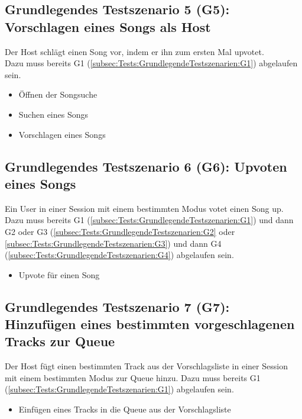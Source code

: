 \documentclass[oneside, ngerman]{sdqtechreport}
\begin{document}
\subsection{Grundlegendes Testszenario 5 (G5): Vorschlagen eines Songs als Host}
\label{subsec:Tests:GrundlegendeTestszenarien:G5}
Der Host schlägt einen Song vor, indem er ihn zum ersten Mal upvotet. \\
Dazu muss bereits G1 (\ref{subsec:Tests:GrundlegendeTestszenarien:G1}) abgelaufen sein.
\begin{itemize}
    \item Öffnen der Songsuche
    \item Suchen eines Songs
    \item Vorschlagen eines Songs
\end{itemize}

\subsection{Grundlegendes Testszenario 6 (G6): Upvoten eines Songs}
\label{subsec:Tests:GrundlegendeTestszenarien:G6}
Ein User in einer Session mit einem bestimmten Modus votet einen Song up. \\
Dazu muss bereits G1 (\ref{subsec:Tests:GrundlegendeTestszenarien:G1}) und dann G2 oder G3 (\ref{subsec:Tests:GrundlegendeTestszenarien:G2} oder \ref{subsec:Tests:GrundlegendeTestszenarien:G3}) und dann G4 (\ref{subsec:Tests:GrundlegendeTestszenarien:G4}) abgelaufen sein.
\begin{itemize}
    \item Upvote für einen Song
\end{itemize}

\subsection{Grundlegendes Testszenario 7 (G7): Hinzufügen eines bestimmten vorgeschlagenen Tracks zur Queue}
\label{subsec:Tests:GrundlegendeTestszenarien:G7}
Der Host fügt einen bestimmten Track aus der Vorschlagsliste in einer Session mit einem bestimmten Modus zur Queue hinzu.
Dazu muss bereits G1 (\ref{subsec:Tests:GrundlegendeTestszenarien:G1}) abgelaufen sein.
\begin{itemize}
    \item Einfügen eines Tracks in die Queue aus der Vorschlagsliste
\end{itemize}
\end{document}
